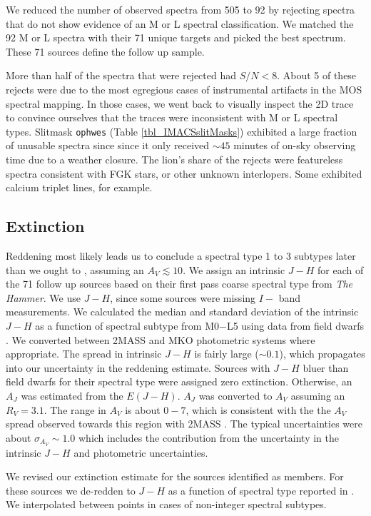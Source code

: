 We reduced the number of observed spectra from 505 to 92 by rejecting spectra that do not show evidence of an M or L spectral classification.  We matched the 92 M or L spectra with their 71 unique targets and picked the best spectrum.  These 71 sources define the follow up sample.  

More than half of the spectra that were rejected had $S/N < 8$.  About 5 of these rejects were due to the most egregious cases of instrumental artifacts in the MOS spectral mapping.  In those cases, we went back to visually inspect the 2D trace to convince ourselves that the traces were inconsistent with M or L spectral types.  Slitmask \texttt{ophwes} (Table \ref{tbl_IMACSslitMasks}) exhibited a large fraction of unusable spectra since since it only received $\sim45$ minutes of on-sky observing time due to a weather closure.  The lion's share of the rejects were featureless spectra consistent with FGK stars, or other unknown interlopers.  Some exhibited calcium triplet lines, for example.  


\subsection{Extinction}
Reddening most likely leads us to conclude a spectral type 1 to 3 subtypes later than we ought to \citep{2010A&A...515A..75A}, assuming an $A_V\lesssim10$.  We assign an intrinsic $J-H$ for each of the 71 follow up sources based on their first pass coarse spectral type from \emph{The Hammer}.  We use $J-H$, since some sources were missing $I-$ band measurements.  We calculated the median and standard deviation of the intrinsic $J-H$ as a function of spectral subtype from M0$-$L5 using data from field dwarfs \citep{2011AJ....141...97W,2012ApJS..201...19D}.  We converted between 2MASS and MKO photometric systems where appropriate.  The spread in intrinsic $J-H$ is fairly large ($\sim0.1$), which propagates into our uncertainty in the reddening estimate.  Sources with $J-H$ bluer than field dwarfs for their spectral type were assigned zero extinction.  Otherwise, an $A_J$ was estimated from the $E(J-H)$.  $A_J$ was converted to $A_V$ assuming an $R_V=3.1$.  The range in $A_V$ is about $0 - 7$, which is consistent with the the $A_V$ spread observed towards this region with 2MASS \citep{2008A&A...489..143L}.  The typical uncertainties were about $\sigma_{A_V}\sim1.0$ which includes the contribution from the uncertainty in the intrinsic $J-H$ and photometric uncertainties.

We revised our extinction estimate for the sources identified as members.  For these sources we de-redden to $J-H$ as a function of spectral type reported in \citet{2013ApJS..208....9P}.  We interpolated between points in cases of non-integer spectral subtypes.

